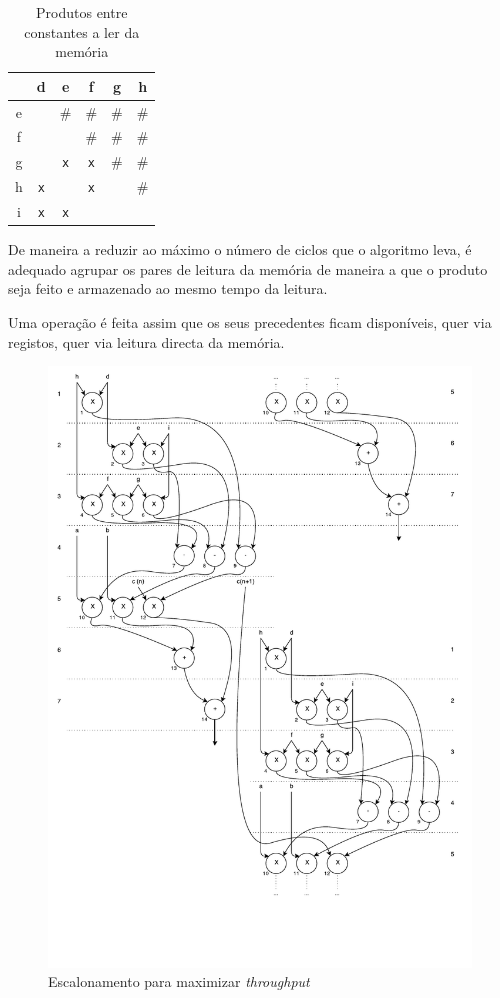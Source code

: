 \begin{table}[h]
	\centering
	\begin{tabular}{|c||c|c|c|c|c|}
		\hline
		& d & e & f & g & h  \\
		\hline
		\hline
		e &  & \# & \# & \# & \#  \\
		\hline
		f &  &  & \# & \# & \# \\
		\hline
		g &  & \texttt{x} & \texttt{x} & \# & \#	 \\
		\hline
		h & \texttt{x} &  & \texttt{x} &  & \# \\
		\hline
		i & \texttt{x} & \texttt{x} &  &  &  \\
		\hline
	\end{tabular}
	\caption{Produtos entre constantes a ler da memória}
	\label{tab:produtos}
\end{table}

De maneira a reduzir ao máximo o número de ciclos que o algoritmo leva, é adequado agrupar os pares de leitura da memória de maneira a que o produto seja feito e armazenado ao mesmo tempo da leitura.

Uma operação é feita assim que os seus precedentes ficam disponíveis, quer via registos, quer via leitura directa da memória.

\begin{figure}[h]
\centerline{\includegraphics[width=0.7\paperwidth]{scheduling_2portRAM_maxthrough}}
\caption{Escalonamento para maximizar \textit{throughput}}
\label{fig:scheduling_2portRAM_maxthrough}
\end{figure}

